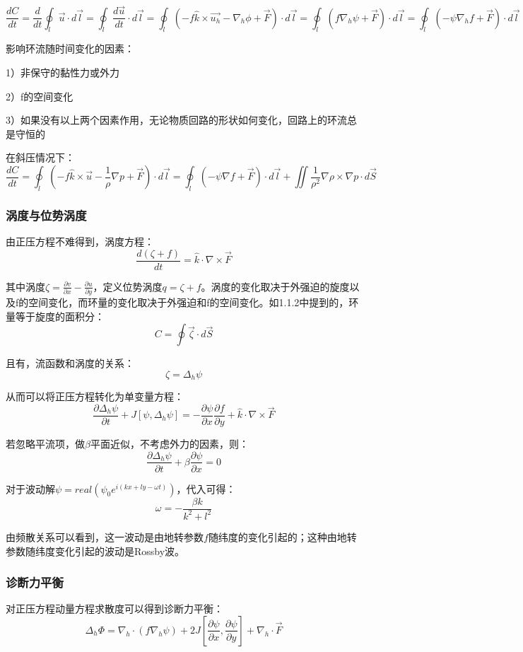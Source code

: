 \documentclass{article}
\begin{document}
$$\frac{dC}{dt} = \frac{d}{dt}\oint_l \vec{u}\cdot d\vec{l}=\oint_l \frac{d\vec{u}}{dt}\cdot d\vec{l}=\oint_l (-f\hat{k}\times\vec{u_h}-\nabla_h \phi + \vec{F})\cdot d\vec{l}=\oint_l (f\nabla_h\psi+ \vec{F})\cdot d\vec{l}=\oint_l (-\psi\nabla_hf+ \vec{F})\cdot d\vec{l}$$

影响环流随时间变化的因素：

1）非保守的黏性力或外力

2）f的空间变化

3）如果没有以上两个因素作用，无论物质回路的形状如何变化，回路上的环流总是守恒的

在斜压情况下：
$$\frac{dC}{dt} = \oint_l (-f\hat{k}\times\vec{u}-\frac{1}{\rho}\nabla p +\vec{F})\cdot d\vec{l}=\oint_l (-\psi\nabla f+ \vec{F})\cdot d\vec{l} +  \iint\frac{1}{\rho^2}\nabla\rho\times\nabla p\cdot d\vec{S}$$


\subsubsection{涡度与位势涡度}
由正压方程不难得到，涡度方程：
$$\frac{d(\zeta+f)}{dt}=\hat{k}\cdot\nabla\times\vec{F}$$

其中涡度$\zeta=\frac{\partial v}{\partial x} - \frac{\partial u}{\partial y}$，定义位势涡度$q = \zeta + f$。涡度的变化取决于外强迫的旋度以及f的空间变化，而环量的变化取决于外强迫和f的空间变化。如1.1.2中提到的，环量等于旋度的面积分：
$$C = \oint\vec{\zeta}\cdot d\vec{S}$$

且有，流函数和涡度的关系：
$$\zeta = \Delta_h \psi$$

从而可以将正压方程转化为单变量方程：
$$\frac{\partial\Delta_h\psi}{\partial t} + J[\psi, \Delta_h\psi] = -\frac{\partial\psi}{\partial x}\frac{\partial f}{\partial y}+\hat{k}\cdot\nabla\times\vec{F}$$

若忽略平流项，做$\beta$平面近似，不考虑外力的因素，则：
$$\frac{\partial\Delta_h\psi}{\partial t}+\beta\frac{\partial\psi}{\partial x}=0$$

对于波动解$\psi = real\left(\psi_0e^{i(kx+ly-\omega t)}\right)$，代入可得：
$$\omega = -\frac{\beta k}{k^2+l^2}$$

由频散关系可以看到，这一波动是由地转参数$f$随纬度的变化引起的；这种由地转参数随纬度变化引起的波动是Rossby波。

\subsubsection{诊断力平衡}
对正压方程动量方程求散度可以得到诊断力平衡：
$$\Delta_h\Phi = \nabla_h\cdot(f\nabla_h\psi)+2J[\frac{\partial \psi}{\partial x},\frac{\partial \psi}{\partial y}]+\nabla_h\cdot\vec{F}$$
\end{document}

